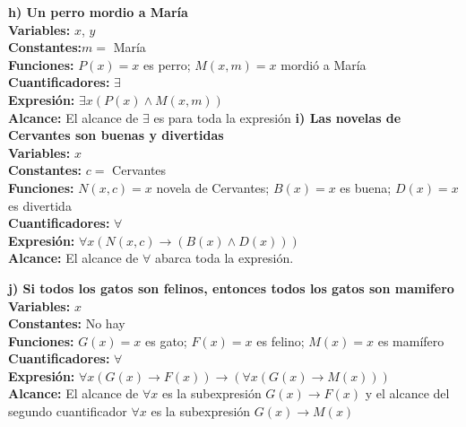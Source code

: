 \begin{multicols}{2}
	\textbf{h) Un perro mordio a María}\\
	\textbf{Variables: } $x$, $y$\\
	\textbf{Constantes:}$m =$ María \\
	\textbf{Funciones: }$P(x)=x$ es perro; $M(x,m)=x$ mordió a María \\
	\textbf{Cuantificadores: }$\exists$\\
	\textbf{Expresión: } $\exists x(P(x)\land M(x,m))$\\
	\textbf{Alcance: }El alcance de $\exists$ es para toda la expresión
	\vspace{20px}
\newpage
	\textbf{i) Las novelas de Cervantes son buenas y divertidas}\\
	\textbf{Variables: }$x$\\
	\textbf{Constantes: } $c =$ Cervantes\\
	\textbf{Funciones: }$N(x,c) = x$ novela de Cervantes; $B(x)= x$ es buena; $D(x)=x$ es divertida\\
	\textbf{Cuantificadores: }$\forall$\\
	\textbf{Expresión: } $\forall x(N(x,c)\rightarrow (B(x)\land D(x)))$\\
	\textbf{Alcance: }El alcance de $\forall$ abarca toda la expresión.
	\vspace{20px}

	\textbf{j) Si todos los gatos son felinos, entonces todos los gatos son mamifero}\\
	\textbf{Variables: }$x$\\
	\textbf{Constantes: } No hay\\
	\textbf{Funciones: }$G(x)= x$ es gato; $F(x)=x$ es felino; $M(x)=x$ es mamífero\\
	\textbf{Cuantificadores: }$\forall$\\
	\textbf{Expresión: }$\forall x(G(x)\rightarrow F(x))\rightarrow(\forall x (G(x)\rightarrow M(x)))$\\
	\textbf{Alcance: } El alcance de $\forall x$ es la subexpresión $G(x)\rightarrow F(x)$ y el alcance del segundo cuantificador $\forall x$ es la subexpresión $G(x)\rightarrow M(x)$
\end{multicols}
